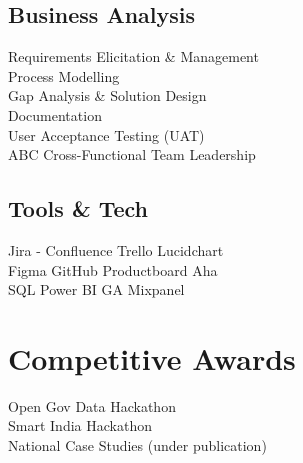 \documentclass[]{deedy-resume-reversed}
\begin{document}
\begin{minipage}[t]{0.33\textwidth}
\sectionsep

\subsection{Business Analysis}
Requirements Elicitation \& Management\\
Process Modelling\\
Gap Analysis \& Solution Design\\
Documentation\\
User Acceptance Testing (UAT)\\ABC 
Cross-Functional Team Leadership\\
\sectionsep

\subsection{Tools \& Tech}

Jira - Confluence \textbullet{} Trello \textbullet{} Lucidchart\\
Figma \textbullet{} GitHub \textbullet{} Productboard Aha\\
SQL \textbullet{} Power BI \textbullet{} GA \textbullet{} Mixpanel\\
\sectionsep



\section{Competitive Awards}
Open Gov Data Hackathon\\
Smart India Hackathon\\
National Case Studies (under publication)\\

\sectionsep



\end{minipage}
\end{document}

